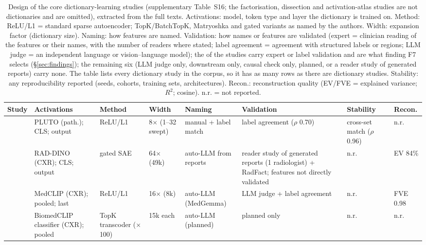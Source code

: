 \begin{table}
\centering\scriptsize\setlength\tabcolsep{3.5pt}\renewcommand{\arraystretch}{0.92}
\caption{Design of the core dictionary-learning studies (supplementary Table~S16; the factorisation, dissection and activation-atlas studies are not dictionaries and are omitted), extracted from the full texts. Activations: model, token type and layer the dictionary is trained on. Method: ReLU/L1 = standard sparse autoencoder; TopK/BatchTopK, Matryoshka and gated variants as named by the authors. Width: expansion factor (dictionary size). Naming: how features are named. Validation: how names or features are validated (expert = clinician reading of the features or their names, with the number of readers where stated; label agreement = agreement with structured labels or regions; LLM judge = an independent language or vision--language model); the \Nsaeval{} of the \Nsae{} studies carry expert or label validation and are what finding F7 selects (\S\ref{sec:findings}); the remaining six (LLM judge only, downstream only, causal check only, planned, or a reader study of generated reports) carry none. The table lists every dictionary study in the corpus, so it has as many rows as there are dictionary studies. Stability: any reproducibility reported (seeds, cohorts, training sets, architectures). Recon.: reconstruction quality (EV/FVE = explained variance; $R^2$; cosine). n.r. = not reported.}
\label{tab:saedesign}
\begin{tabular}{@{}L{2.80cm}L{3.85cm}L{2.51cm}L{1.73cm}L{2.26cm}L{2.93cm}L{1.73cm}L{1.46cm}@{}}
\toprule
Study & Activations & Method & Width & Naming & Validation & Stability & Recon. \\
\midrule
\cite{le2024learning} & PLUTO (path.); CLS; output & ReLU/L1 & 8$\times$ (1--32 swept) & manual + label match & label agreement ($\rho$ 0.70) & cross-set match ($\rho$ 0.96) & n.r. \\
\cite{abdulaal2024an} & RAD-DINO (CXR); CLS; output & gated SAE & 64$\times$ (49k) & auto-LLM from reports & reader study of generated reports (1 radiologist) + RadFact; features not directly validated & n.r. & EV 84\% \\
\cite{renzulli2025medsae} & MedCLIP (CXR); pooled; last & ReLU/L1 & 16$\times$ (8k) & auto-LLM (MedGemma) & LLM judge + label agreement & n.r. & FVE 0.98 \\
\cite{tang2025cxrlanic} & BiomedCLIP classifier (CXR); pooled & TopK transcoder ($\times$100) & 15k each & auto-LLM (planned) & planned only & n.r. & n.r. \\

\end{tabular}
\end{table}
